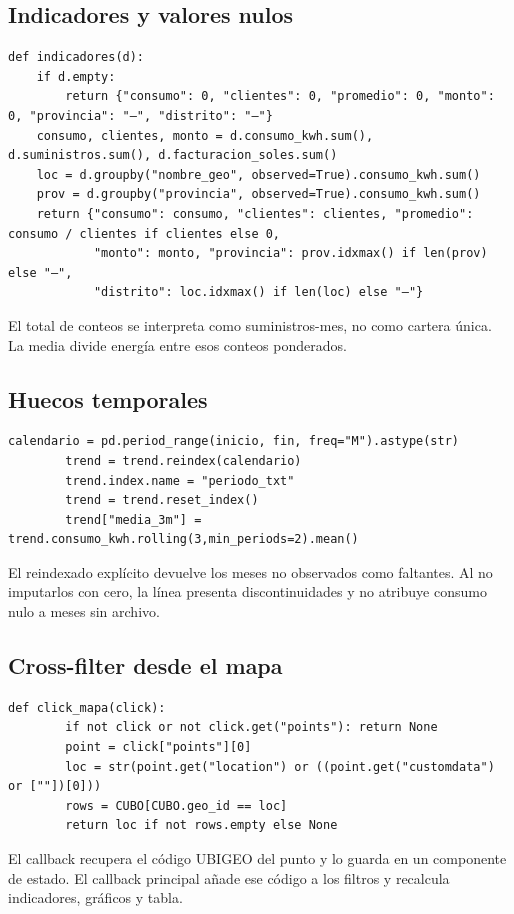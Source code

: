 \documentclass[11pt,a4paper]{article}
\begin{document}
\subsection{Indicadores y valores nulos}
\begin{lstlisting}[caption={dashboard/calculos.py — indicadores, caso vacío}]
def indicadores(d):
    if d.empty:
        return {"consumo": 0, "clientes": 0, "promedio": 0, "monto": 0, "provincia": "—", "distrito": "—"}
    consumo, clientes, monto = d.consumo_kwh.sum(), d.suministros.sum(), d.facturacion_soles.sum()
    loc = d.groupby("nombre_geo", observed=True).consumo_kwh.sum()
    prov = d.groupby("provincia", observed=True).consumo_kwh.sum()
    return {"consumo": consumo, "clientes": clientes, "promedio": consumo / clientes if clientes else 0,
            "monto": monto, "provincia": prov.idxmax() if len(prov) else "—",
            "distrito": loc.idxmax() if len(loc) else "—"}
\end{lstlisting}
El total de conteos se interpreta como suministros-mes, no como cartera única. La media divide energía entre esos conteos ponderados.

\subsection{Huecos temporales}
\begin{lstlisting}[caption={dashboard/app.py — actualizar, calendario mensual}]
        calendario = pd.period_range(inicio, fin, freq="M").astype(str)
        trend = trend.reindex(calendario)
        trend.index.name = "periodo_txt"
        trend = trend.reset_index()
        trend["media_3m"] = trend.consumo_kwh.rolling(3,min_periods=2).mean()
\end{lstlisting}
El reindexado explícito devuelve los meses no observados como faltantes. Al no imputarlos con cero, la línea presenta discontinuidades y no atribuye consumo nulo a meses sin archivo.

\subsection{Cross-filter desde el mapa}
\begin{lstlisting}[caption={dashboard/app.py — click\_mapa}]
    def click_mapa(click):
        if not click or not click.get("points"): return None
        point = click["points"][0]
        loc = str(point.get("location") or ((point.get("customdata") or [""])[0]))
        rows = CUBO[CUBO.geo_id == loc]
        return loc if not rows.empty else None
\end{lstlisting}
El callback recupera el código UBIGEO del punto y lo guarda en un componente de estado. El callback principal añade ese código a los filtros y recalcula indicadores, gráficos y tabla.
\end{document}
